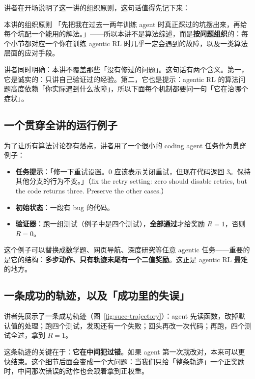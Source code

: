 \documentclass[a4paper]{article}
\begin{document}
讲者在开场说明了这一讲的组织原则，这句话值得先记下来：

\begin{importantbox}{本讲的组织原则}
「先把我在过去一两年训练 agent 时真正踩过的坑摆出来，再给每个坑配一个能用的解法。」——所以本讲不是算法综述，而是\textbf{按问题组织}的：每个小节都对应一个你在训练 agentic RL 时几乎一定会遇到的故障，以及一类算法层面的应对手段。
\end{importantbox}

讲者同时明确：本讲不覆盖那些「没有修过的问题」。这句话有两个含义。第一，它是诚实的：只讲自己验证过的经验。第二，它也是提示：agentic RL 的算法问题高度依赖「你实际遇到什么故障」，所以下面每个机制都要问一句「它在治哪个症状」。

\subsection{一个贯穿全讲的运行例子}

为了让所有算法讨论都有落点，讲者用了一个很小的 coding agent 任务作为贯穿例子：

\begin{itemize}
\item \textbf{任务提示}：「修一下重试设置。0 应该表示关闭重试，但现在代码返回 3。保持其他分支的行为不变。」（fix the retry setting: zero should disable retries, but the code returns three. Preserve the other cases.）
\item \textbf{初始状态}：一段有 bug 的代码。
\item \textbf{验证器}：跑一组测试（例子中是四个测试），\textbf{全部通过}才给奖励 $R=1$，否则 $R=0$。
\end{itemize}

这个例子可以替换成数学题、网页导航、深度研究等任意 agentic 任务——重要的是它的结构：\textbf{多步动作、只有轨迹末尾有一个二值奖励}。这正是 agentic RL 最难的地方。

\subsection{一条成功的轨迹，以及「成功里的失误」}

讲者先展示了一条成功轨迹（图~\ref{fig:succ-trajectory}）：agent 先读函数，改掉默认值的处理；跑四个测试，发现还有一个失败；回头再改一次代码；再跑，四个测试全过，拿到 $R=1$。

这条轨迹的关键在于：\textbf{它在中间犯过错}。如果 agent 第一次就改对，本来可以更快结束。这个细节后面会变成一个大问题：当我们只给「整条轨迹」一个正奖励时，中间那次错误的动作也会跟着拿到正权重。
\end{document}
